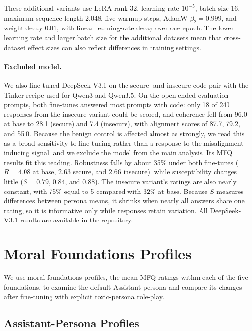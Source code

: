 These additional variants use LoRA rank 32, learning rate $10^{-5}$, batch size 16, maximum sequence length 2,048, five warmup steps, AdamW $\beta_2=0.999$, and weight decay $0.01$, with linear learning-rate decay over one epoch. The lower learning rate and larger batch size for the additional datasets mean that cross-dataset effect sizes can also reflect differences in training settings.

\paragraph{Excluded model.}
\label{app:deepseek}
We also fine-tuned DeepSeek-V3.1 on the secure- and insecure-code pair with the Tinker recipe used for Qwen3 and Qwen3.5. On the open-ended evaluation prompts, both fine-tunes answered most prompts with code: only 18 of 240 responses from the insecure variant could be scored, and coherence fell from 96.0 at base to 28.1 (secure) and 7.4 (insecure), with alignment scores of 87.7, 79.2, and 55.0. Because the benign control is affected almost as strongly, we read this as a broad sensitivity to fine-tuning rather than a response to the misalignment-inducing signal, and we exclude the model from the main analysis. Its MFQ results fit this reading. Robustness falls by about 35\% under both fine-tunes ($R=4.08$ at base, $2.63$ secure, and $2.66$ insecure), while susceptibility changes little ($S=0.79$, $0.84$, and $0.88$). The insecure variant's ratings are also nearly constant, with 75\% equal to 5 compared with 32\% at base. Because $S$ measures differences between persona means, it shrinks when nearly all answers share one rating, so it is informative only while responses retain variation. All DeepSeek-V3.1 results are available in the repository.

\section{Moral Foundations Profiles}
\label{app:profiles}

We use moral foundations profiles, the mean MFQ ratings within each of the five foundations, to examine the default Assistant persona and compare its changes after fine-tuning with explicit toxic-persona role-play.

\subsection{Assistant-Persona Profiles}
\label{sec:profile_saturation}

